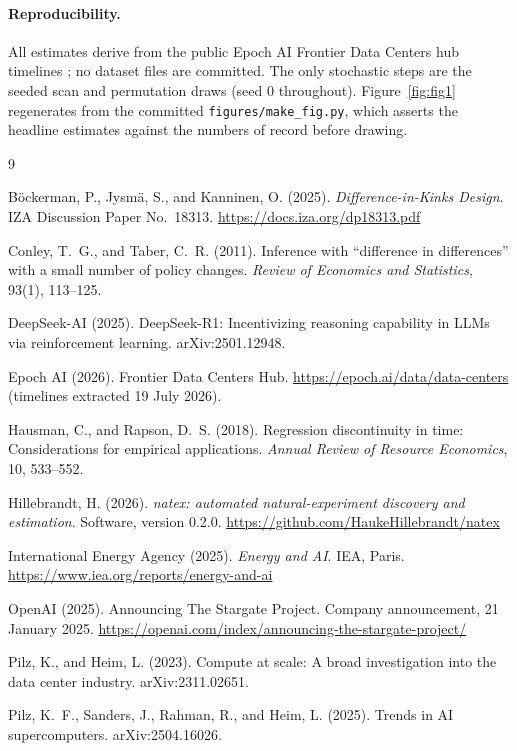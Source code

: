 \documentclass[11pt]{article}
\begin{document}
\paragraph{Reproducibility.} All estimates derive from the public Epoch AI
Frontier Data Centers hub timelines \cite{epochdc}; no dataset files are
committed. The only stochastic steps are the seeded scan and permutation
draws (seed 0 throughout). Figure~\ref{fig:fig1} regenerates from the
committed \texttt{figures/make\_fig.py}, which asserts the headline estimates
against the numbers of record before drawing.

\footnotesize
\begin{thebibliography}{9}
\setlength{\itemsep}{1pt}\setlength{\parskip}{0pt}

B\"ockerman, P., Jysm\"a, S., and Kanninen, O. (2025).
\emph{Difference-in-Kinks Design}.
IZA Discussion Paper No.~18313.
\url{https://docs.iza.org/dp18313.pdf}

Conley, T.~G., and Taber, C.~R. (2011).
Inference with ``difference in differences'' with a small number of policy
changes.
\emph{Review of Economics and Statistics}, 93(1), 113--125.

DeepSeek-AI (2025).
DeepSeek-R1: Incentivizing reasoning capability in LLMs via reinforcement
learning.
arXiv:2501.12948.

Epoch AI (2026).
Frontier Data Centers Hub.
\url{https://epoch.ai/data/data-centers} (timelines extracted 19 July 2026).

Hausman, C., and Rapson, D.~S. (2018).
Regression discontinuity in time: Considerations for empirical applications.
\emph{Annual Review of Resource Economics}, 10, 533--552.

Hillebrandt, H. (2026).
\emph{natex: automated natural-experiment discovery and estimation}.
Software, version 0.2.0.
\url{https://github.com/HaukeHillebrandt/natex}

International Energy Agency (2025).
\emph{Energy and AI}.
IEA, Paris. \url{https://www.iea.org/reports/energy-and-ai}

OpenAI (2025).
Announcing The Stargate Project.
Company announcement, 21 January 2025.
\url{https://openai.com/index/announcing-the-stargate-project/}

Pilz, K., and Heim, L. (2023).
Compute at scale: A broad investigation into the data center industry.
arXiv:2311.02651.

Pilz, K.~F., Sanders, J., Rahman, R., and Heim, L. (2025).
Trends in AI supercomputers.
arXiv:2504.16026.

\end{thebibliography}
\end{document}
